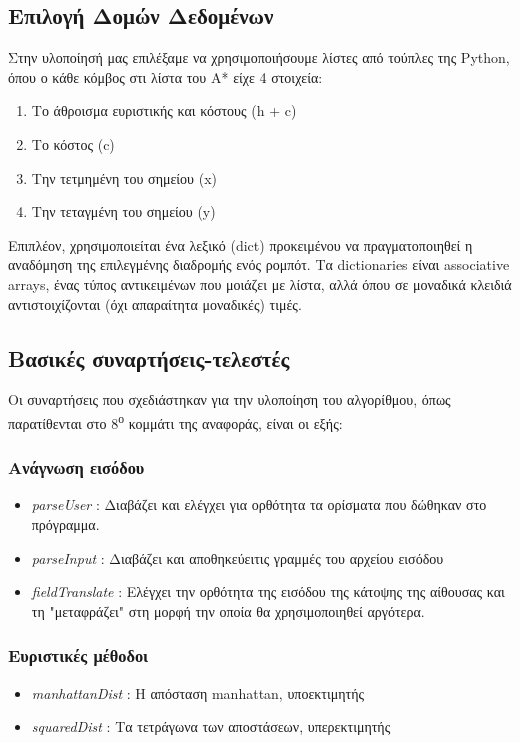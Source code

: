 \documentclass[a4paper,9pt]{article}
\begin{document}


\subsection{Επιλογή Δομών Δεδομένων}
Στην υλοποίησή μας επιλέξαμε να χρησιμοποιήσουμε λίστες από τούπλες της Python,
όπου ο κάθε κόμβος στι λίστα του A* είχε 4 στοιχεία:
\begin{enumerate}
	\item Το άθροισμα ευριστικής και κόστους (h + c)
	\item Το κόστος (c)
	\item Την τετμημένη του σημείου (x)
	\item Την τεταγμένη του σημείου (y)
\end{enumerate}

Επιπλέον, χρησιμοποιείται ένα λεξικό (dict) προκειμένου να
πραγματοποιηθεί η αναδόμηση της επιλεγμένης διαδρομής ενός ρομπότ. Τα
dictionaries είναι associative arrays, ένας τύπος αντικειμένων που μοιάζει με
λίστα, αλλά όπου σε μοναδικά κλειδιά αντιστοιχίζονται (όχι απαραίτητα
μοναδικές) τιμές.



\subsection{Βασικές συναρτήσεις-τελεστές}
Οι συναρτήσεις που σχεδιάστηκαν για την υλοποίηση του αλγορίθμου, όπως
παρατίθενται στο 8\textsuperscript{ο} κομμάτι της αναφοράς, είναι οι εξής:
\subsubsection{Ανάγνωση εισόδου}
\begin{itemize}
	\item \emph{parseUser} : Διαβάζει και ελέγχει για ορθότητα τα ορίσματα
		που δώθηκαν στο πρόγραμμα.
	\item \emph{parseInput} : Διαβάζει και αποθηκεύειτις γραμμές του αρχείου
		εισόδου
	\item \emph{fieldTranslate} : Ελέγχει την ορθότητα της εισόδου της
		κάτοψης της αίθουσας και τη "μεταφράζει" στη μορφή την οποία θα
		χρησιμοποιηθεί αργότερα.
\end{itemize}
\subsubsection{Eυριστικές μέθοδοι}
\begin{itemize}
	\item \emph{manhattanDist} : Η απόσταση manhattan, υποεκτιμητής
	\item \emph{squaredDist} : Τα τετράγωνα των αποστάσεων, υπερεκτιμητής
\end{itemize}
\end{document}
